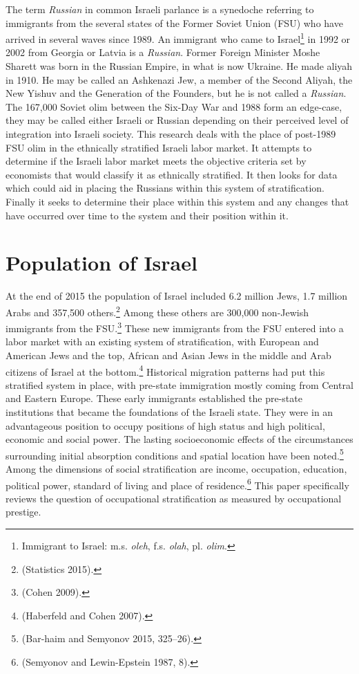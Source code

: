 \documentclass[12pt,twoside]{reedthesis}
\begin{document}
  The term \emph{Russian} in common Israeli parlance is a synedoche
  referring to immigrants from the several states of the Former Soviet
  Union (FSU) who have arrived in several waves since 1989. An immigrant
  who came to Israel\footnote{Immigrant to Israel: m.s. \emph{oleh}, f.s.
    \emph{olah}, pl. \emph{olim}.} in 1992 or 2002 from Georgia or Latvia
  is a \emph{Russian}. Former Foreign Minister Moshe Sharett was born in
  the Russian Empire, in what is now Ukraine. He made aliyah in 1910. He
  may be called an Ashkenazi Jew, a member of the Second Aliyah, the New
  Yishuv and the Generation of the Founders, but he is not called a
  \emph{Russian}. The 167,000 Soviet olim between the Six-Day War and 1988
  form an edge-case, they may be called either Israeli or Russian
  depending on their perceived level of integration into Israeli society.
  This research deals with the place of post-1989 FSU olim in the
  ethnically stratified Israeli labor market. It attempts to determine if
  the Israeli labor market meets the objective criteria set by economists
  that would classify it as ethnically stratified. It then looks for data
  which could aid in placing the Russians within this system of
  stratification. Finally it seeks to determine their place within this
  system and any changes that have occurred over time to the system and
  their position within it.
  
  \chapter{Population of Israel}\label{sec:orgheadline3}
  
  At the end of 2015 the population of Israel included 6.2 million Jews,
  1.7 million Arabs and 357,500 others.\footnote{(Statistics 2015).} Among
  these others are 300,000 non-Jewish immigrants from the FSU.\footnote{(Cohen
    2009).} These new immigrants from the FSU entered into a labor market
  with an existing system of stratification, with European and American
  Jews and the top, African and Asian Jews in the middle and Arab citizens
  of Israel at the bottom.\footnote{(Haberfeld and Cohen 2007).}
  Historical migration patterns had put this stratified system in place,
  with pre-state immigration mostly coming from Central and Eastern
  Europe. These early immigrants established the pre-state institutions
  that became the foundations of the Israeli state. They were in an
  advantageous position to occupy positions of high status and high
  political, economic and social power. The lasting socioeconomic effects
  of the circumstances surrounding initial absorption conditions and
  spatial location have been noted.\footnote{(Bar-haim and Semyonov 2015,
    325--26).} Among the dimensions of social stratification are income,
  occupation, education, political power, standard of living and place of
  residence.\footnote{(Semyonov and Lewin-Epstein 1987, 8).} This paper
  specifically reviews the question of occupational stratification as
  measured by occupational prestige.
  
\end{document}
